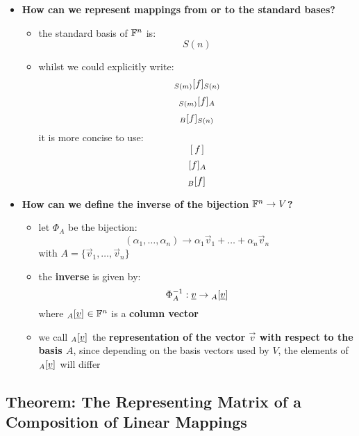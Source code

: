 \documentclass{exam}
\begin{document}
\begin{itemize}
    \item \textbf{How can we represent  mappings from or to the standard bases?}
    \begin{itemize}
        \item the standard basis of $\F^n$ is:
        \[
        S(n)
        \]
        \item whilst we could explicitly write:
        \[
        \cript{f}{S(m)}{S(n)}
        \]
        \[
        \cript{f}{S(m)}{A}
        \]
        \[
        \cript{f}{B}{S(n)}
        \]
        it is more concise to use:
        \[
        [f]
        \]
        \[
        \cript{f}{}{A}
        \]
        \[
        \cript{f}{B}{}
        \]
    \end{itemize}
    \item \textbf{How can we define the inverse of the bijection $\F^n \to V$?}
    \begin{itemize}
        \item let $\Phi_A$ be the bijection:
        \[
        (\alpha_1, \ldots, \alpha_n) \to \alpha_1\vec{v}_1 + \ldots + \alpha_n\vec{v}_n
        \]
        with $A = \{\vec{v}_1, \ldots, \vec{v}_n\}$
        \item the \textbf{inverse} is given by:
        \[
        \Phi_A^{-1} : \vec{v} \to \cript{\vec{v}}{A}{}
        \]
        where $\cript{\vec{v}}{A}{} \in \F^n$ is a \textbf{column vector}
        \item we call $\cript{\vec{v}}{A}{}$ the \textbf{representation of the vector $\vec{v}$ with respect to the basis $A$}, since depending on the basis vectors used by $V$, the elements of $\cript{\vec{v}}{A}{}$ will differ
    \end{itemize}
\end{itemize}

\subsection{Theorem: The Representing Matrix of a Composition of Linear Mappings}

\label{t232}
\end{document}
